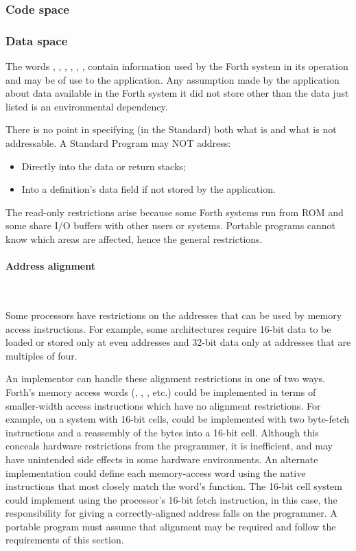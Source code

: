 \subsubsection{Code space} %

\subsubsection{Data space} %
\label{rat:dataspace}

The words , , , ,
, ,   contain information
used by the Forth system in its operation and may be of use to the
application. Any assumption made by the application about data
available in the Forth system it did not store other than the data
just listed is an environmental dependency.

There is no point in specifying (in the Standard) both what is and
what is not addressable. A Standard Program may NOT address:

\begin{itemize}
\item Directly into the data or return stacks;
\item Into a definition's data field if not stored by the application.
\end{itemize}

The read-only restrictions arise because some Forth systems run from
ROM and some share I/O buffers with other users or systems. Portable
programs cannot know which areas are affected, hence the general
restrictions.

\paragraph{Address alignment} ~ %
\label{rat:aaddr}

Some processors have restrictions on the addresses that can be used
by memory access instructions. For example, some architectures require
16-bit data to be loaded or stored only at even addresses and 32-bit
data only at addresses that are multiples of four.

An implementor can handle these alignment restrictions in one of two
ways. Forth's memory access words (, \word{!}, \word{+!},
etc.) could be implemented in terms of smaller-width access instructions
which have no alignment restrictions.  For example, on a system with
16-bit cells,  could be implemented with two byte-fetch
instructions and a reassembly of the bytes into a 16-bit cell.  Although
this conceals hardware restrictions from the programmer, it is inefficient,
and may have unintended side effects in some hardware environments.
An alternate implementation could define each memory-access word
using the native instructions that most closely match the word's function.
The 16-bit cell system could implement  using the processor's
16-bit fetch instruction, in this case, the responsibility for giving
 a correctly-aligned address falls on the programmer.  A
portable program must assume that alignment may be required and
follow the requirements of this section.



